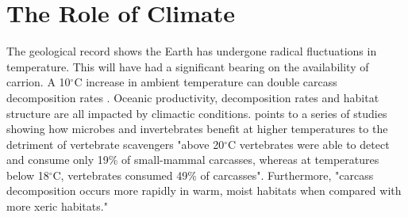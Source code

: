 \documentclass[a4paper,12pt]{article}
\begin{document}
\section*{The Role of Climate}
The geological record shows the Earth has undergone radical fluctuations in temperature. This will have had a significant bearing on the availability of carrion. A 10$^{\circ}$C increase in ambient temperature can double carcass decomposition rates \citep{benbow2015introduction}. Oceanic productivity, decomposition rates and habitat structure are all impacted by climactic conditions. \cite{benbow2015introduction} points to a series of studies showing how microbes and invertebrates benefit at higher temperatures to the detriment of vertebrate scavengers "above 20$^{\circ}$C vertebrates were able to detect and consume only 19\% of small-mammal carcasses, whereas at temperatures below 18$^{\circ}$C, vertebrates consumed 49\% of carcasses". Furthermore, "carcass decomposition occurs more rapidly in warm, moist habitats when compared with more xeric habitats." 




\end{document}
